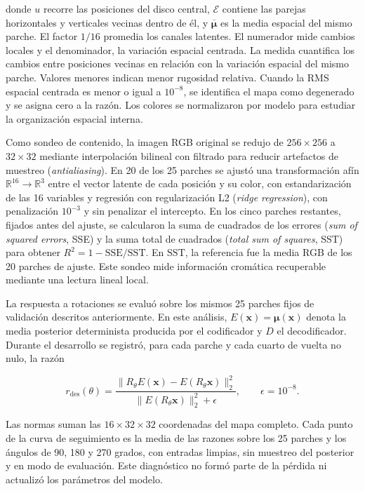 donde \(u\) recorre las posiciones del disco central, \(\mathcal{E}\) contiene
las parejas horizontales y verticales vecinas dentro de él, y
\(\overline{\boldsymbol\mu}\) es la media espacial del mismo parche. El factor
\(1/16\) promedia los canales latentes. El numerador mide cambios locales y el
denominador, la variación espacial centrada. La medida cuantifica los cambios
entre posiciones vecinas en relación con la variación espacial del mismo
parche. Valores menores indican menor rugosidad relativa. Cuando la RMS
espacial centrada es menor o igual a \(10^{-8}\), se identifica el mapa como
degenerado y se asigna cero a la razón. Los colores se normalizaron por modelo
para estudiar la organización espacial interna.

Como sondeo de contenido, la imagen RGB original se redujo de
\(256\times256\) a \(32\times32\) mediante interpolación bilineal con
filtrado para reducir artefactos de muestreo (\emph{antialiasing}). En 20 de los 25 parches se ajustó una transformación afín
\(\mathbb R^{16}\rightarrow\mathbb R^3\) entre el vector latente de cada
posición y su color, con estandarización de las 16 variables y regresión
con regularización L2 (\emph{ridge regression}), con penalización \(10^{-3}\) y sin penalizar el intercepto. En los cinco
parches restantes, fijados antes del ajuste, se calcularon la suma de cuadrados
de los errores (\emph{sum of squared errors}, SSE) y la suma total de cuadrados
(\emph{total sum of squares}, SST) para obtener
\(R^2=1-\mathrm{SSE}/\mathrm{SST}\). En \(\mathrm{SST}\), la referencia fue la
media RGB de los 20 parches de ajuste. Este sondeo mide información cromática
recuperable mediante una lectura lineal local.

La respuesta a rotaciones se evaluó sobre los mismos 25 parches fijos de
validación descritos anteriormente. En este análisis,
\(E(\mathbf x)=\boldsymbol\mu(\mathbf x)\) denota
la media posterior determinista producida por el codificador y \(D\) el
decodificador. Durante el desarrollo se registró, para cada parche y cada
cuarto de vuelta no nulo, la razón

\begin{equation}
    r_{\mathrm{des}}(\theta)
    =\frac{\lVert R_\theta E(\mathbf x)-E(R_\theta\mathbf x)\rVert_2^2}
      {\lVert E(R_\theta\mathbf x)\rVert_2^2+\epsilon},
      \qquad \epsilon=10^{-8}.
    \label{eq:razon-latente-desarrollo}
\end{equation}

Las normas suman las \(16\times32\times32\) coordenadas del mapa completo.
Cada punto de la curva de seguimiento es la media de las razones sobre los
25 parches y los ángulos de 90, 180 y 270 grados, con entradas limpias, sin
muestreo del posterior y en modo de evaluación. Este diagnóstico no formó
parte de la pérdida ni actualizó los parámetros del modelo.

